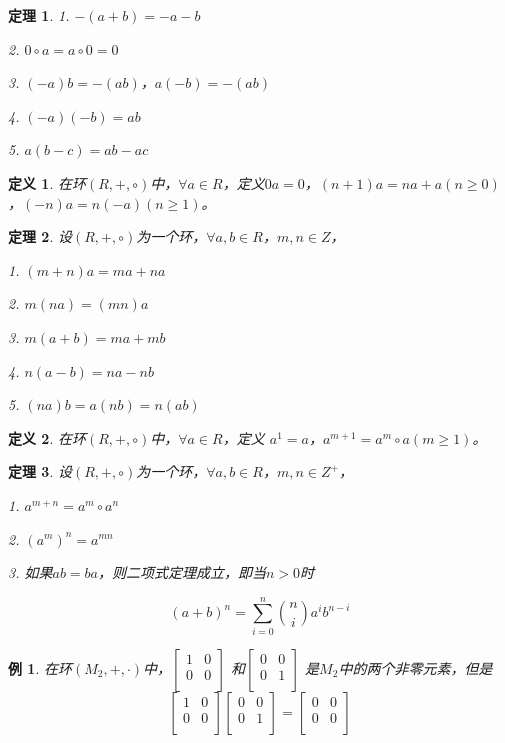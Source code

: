 \documentclass{article}
\newtheorem{Def}{定义}
\newtheorem{Thm}{定理}
\newtheorem*{Example}{例}
\begin{document}
\begin{CJK*}{UTF8}{gbsn}
\begin{Thm}
  1. $-(a+b)=-a-b$

  2. $0\circ a = a\circ 0 = 0$

  3. $(-a)b = -(ab)$，$a(-b)=-(ab)$

  4. $(-a)(-b)=ab$

  5. $a(b-c)=ab-ac$

\end{Thm}

\begin{Def}
  在环$(R,+,\circ)$中，$\forall a\in R$，定义$0a=0$，$(n+1)a=na+a(n\geq 0)$，$(-n)a=n(-a)(n\geq 1)$。
\end{Def}

\begin{Thm}
  设$(R,+,\circ)$为一个环，$\forall a,b \in R$，$m, n \in Z$，

  1. $(m+n)a=ma + na$

  2. $m(na)=(mn)a$

  3. $m(a+b) = ma + mb$

  4. $n(a-b) = na - nb$

  5. $(na)b=a(nb)=n(ab)$
\end{Thm}

\begin{Def}
  在环$(R,+,\circ)$中，$\forall a\in R$，定义
  $a^1=a$，$a^{m+1}=a^m\circ a(m\geq 1)$。
\end{Def}

\begin{Thm}
  设$(R,+,\circ)$为一个环，$\forall a,b \in R$，$m, n \in Z^+$，

  1. $a^{m+n}=a^m \circ a^n$

  2. $(a^{m})^n=a^{mn}$

  3. 如果$ab=ba$，则二项式定理成立，即当$n>0$时

  \[(a+b)^n=\sum_{i=0}^{n}\binom{n}{i}a^ib^{n-i}\]
\end{Thm}

\begin{Example}
  在环$(M_2,+,\cdot)$中，$\begin{bmatrix}
    1&0\\
    0&0\\
  \end{bmatrix}$
  和$\begin{bmatrix}
    0&0\\
    0&1\\
  \end{bmatrix}$
  是$M_2$中的两个非零元素，但是\[\begin{bmatrix}
    1&0\\
    0&0\\
  \end{bmatrix}\begin{bmatrix}
    0&0\\
    0&1\\
  \end{bmatrix}=\begin{bmatrix}
    0&0\\
    0&0\\
  \end{bmatrix}\]
\end{Example}


\end{CJK*}
\end{document}
